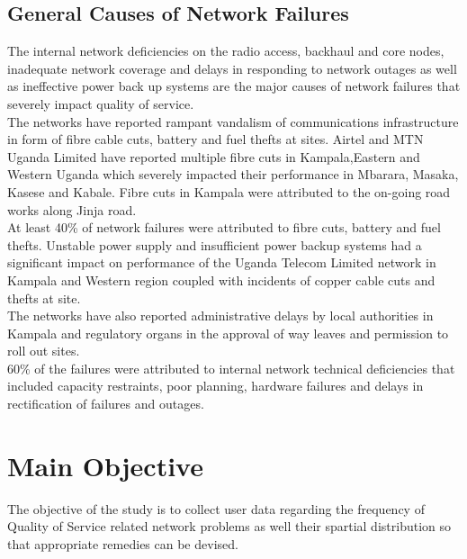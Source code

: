 \documentclass[11pt]{article} %
\begin{document}
\subsection{General Causes of Network Failures}
The internal network deficiencies on the radio access, backhaul and core nodes, inadequate network coverage and delays in responding to network outages as well as ineffective power back up systems are the major causes of network failures that severely impact quality of service.\\ The networks have reported rampant vandalism of communications infrastructure in form of fibre cable cuts, battery and fuel thefts at sites. Airtel and MTN Uganda Limited have reported multiple fibre cuts in Kampala,Eastern and Western Uganda which severely impacted their performance in Mbarara, Masaka, Kasese and Kabale. Fibre cuts in Kampala were attributed to the on-going road works along Jinja road.\\At least 40\% of network failures were attributed to fibre cuts, battery and fuel thefts. Unstable power supply and insufficient power backup systems had a significant impact on performance of the Uganda Telecom Limited network in Kampala and Western region coupled with incidents of copper cable cuts and thefts at site. \\The networks have also reported administrative delays by local authorities in Kampala and regulatory organs in the approval of way leaves and permission to roll out sites.\\60\% of the failures were attributed to internal network technical deficiencies that included capacity restraints, poor planning, hardware failures and delays in rectification of failures and outages.
\section{Main Objective}
The objective of the study is to collect user data regarding the frequency of Quality of Service related network problems as well their spartial distribution so that appropriate remedies can be devised. 
\end{document}
